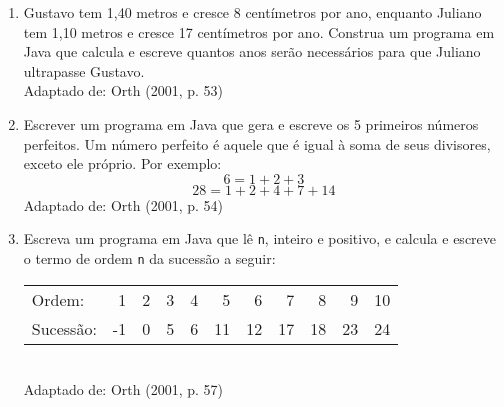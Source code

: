 \documentclass[onecolumn,a4paper,10pt]{report}
\newcommand{\+}{\, + \,}
\newcommand{\<}{\hspace*{-0.4cm}}
\begin{document}
\begin{enumerate}[1.]
\item Gustavo tem 1,40 metros e cresce 8 centímetros por ano, enquanto Juliano tem 1,10 metros e cresce 17 centímetros por ano. Construa um programa em Java que calcula e escreve quantos anos serão necessários para que Juliano ultrapasse Gustavo.\\
{\tiny Adaptado de: Orth (2001, p. 53)}

\item Escrever um programa em Java que gera e escreve os 5 primeiros números perfeitos. Um número perfeito é aquele que é igual à soma de seus divisores, exceto ele próprio. Por exemplo:
\[  6 = 1 + 2 + 3\]
\[ 28 = 1 + 2 + 4 + 7 + 14 \]
{\tiny Adaptado de: Orth (2001, p. 54)}

\item Escreva um programa em Java que lê \texttt{n}, inteiro e positivo, e calcula e escreve o termo de ordem \texttt{n} da sucessão a seguir:\\
\begin{tabular}{lrrrrrrrrrr}
Ordem: & 1 & 2 & 3 & 4 & 5 & 6 & 7 & 8 & 9 & 10\\
Sucessão: & -1 & 0 & 5 & 6 & 11 & 12 & 17 & 18 & 23 & 24\\
\end{tabular}\\
{\tiny Adaptado de: Orth (2001, p. 57)}


\end{enumerate}
\end{document}
